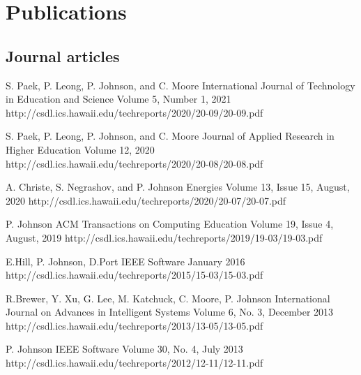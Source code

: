 \documentclass[11pt,letterpaper,sans]{moderncv} %
\begin{document}
\section{Publications}
\subsection{Journal articles}

          {S. Paek, P. Leong, P. Johnson, and C. Moore}
          {International Journal of Technology in Education and Science}
          {Volume 5, Number 1, 2021}
          {http://csdl.ics.hawaii.edu/techreports/2020/20-09/20-09.pdf}

          {S. Paek, P. Leong, P. Johnson, and C. Moore}
          {Journal of Applied Research in Higher Education}
          {Volume 12, 2020}
          {http://csdl.ics.hawaii.edu/techreports/2020/20-08/20-08.pdf}

          {A. Christe, S. Negrashov, and P. Johnson}
          {Energies}
          {Volume 13, Issue 15, August, 2020}
          {http://csdl.ics.hawaii.edu/techreports/2020/20-07/20-07.pdf}

          {P. Johnson}
          {ACM Transactions on Computing Education}
          {Volume 19, Issue 4, August, 2019}
          {http://csdl.ics.hawaii.edu/techreports/2019/19-03/19-03.pdf}

          {E.Hill,  P. Johnson, D.Port}
          {IEEE Software}
          {January 2016}
          {http://csdl.ics.hawaii.edu/techreports/2015/15-03/15-03.pdf}


          {R.Brewer, Y. Xu, G. Lee, M. Katchuck, C. Moore, P. Johnson}
          {International Journal on Advances in Intelligent Systems}
          {Volume 6, No. 3, December 2013}
          {http://csdl.ics.hawaii.edu/techreports/2013/13-05/13-05.pdf}

          {P. Johnson}
          {IEEE Software}
          {Volume 30, No. 4, July 2013}
          {http://csdl.ics.hawaii.edu/techreports/2012/12-11/12-11.pdf}
\end{document}
